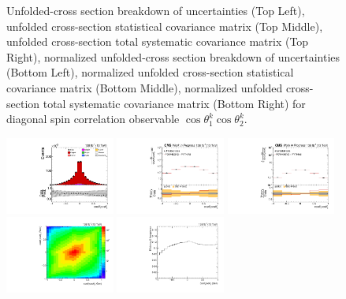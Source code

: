 \begin{figure}[htb]
\begin{center}
\caption{Unfolded-cross section breakdown of uncertainties (Top Left), unfolded cross-section statistical covariance matrix (Top Middle), unfolded cross-section total systematic covariance matrix (Top Right), normalized unfolded-cross section breakdown of uncertainties (Bottom Left), normalized unfolded cross-section statistical covariance matrix (Bottom Middle), normalized unfolded cross-section total systematic covariance matrix (Bottom Right) for diagonal spin correlation observable $\cos\theta_{1}^{k}\cos\theta_{2}^{k}$.}
\label{fig:c_kk_uncertainties}
\end{center}
\end{figure}
\clearpage
\begin{figure}[htb]
\begin{center}
 \includegraphics[width=0.32\textwidth]{fig_fullRun2UL/controlplots/combined/Hyp_LLBarCrr.pdf}
 \includegraphics[width=0.32\textwidth]{fig_fullRun2UL/unfolding/combined/UnfoldedResults_c_rr.pdf}
 \includegraphics[width=0.32\textwidth]{fig_fullRun2UL/unfolding/combined/UnfoldedResultsNorm_c_rr.pdf} \\
 \includegraphics[width=0.32\textwidth]{fig_fullRun2UL/unfolding/combined/ResponseMatrix_c_rr.pdf}
 \includegraphics[width=0.32\textwidth]{fig_fullRun2UL/unfolding/combined/TotEff_c_rr.pdf}

\end{center}
\end{figure}
